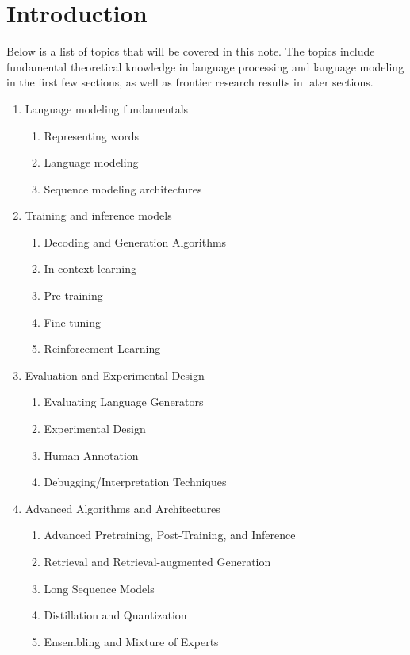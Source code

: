 \documentclass[a4paper]{article}
\begin{document}
\maketitle

\tableofcontents

\section{Introduction}

Below is a list of topics that will be covered in this note. 
The topics include fundamental theoretical knowledge in 
language processing and language modeling in the first 
few sections, as well as frontier research results
in later sections.

\begin{enumerate}
  \item Language modeling fundamentals 
  \begin{enumerate}
    \item Representing words 
    \item Language modeling 
    \item Sequence modeling architectures
  \end{enumerate}

  \item Training and inference models
  \begin{enumerate}
    \item Decoding and Generation Algorithms
    \item In-context learning
    \item Pre-training
    \item Fine-tuning
    \item Reinforcement Learning
  \end{enumerate}

  \item Evaluation and Experimental Design
  \begin{enumerate}
    \item Evaluating Language Generators
    \item Experimental Design
    \item Human Annotation
    \item Debugging/Interpretation Techniques
  \end{enumerate}

  \item Advanced Algorithms and Architectures 
  \begin{enumerate}
    \item Advanced Pretraining, Post-Training, and Inference
    \item Retrieval and Retrieval-augmented Generation
    \item Long Sequence Models
    \item Distillation and Quantization
    \item Ensembling and Mixture of Experts
  \end{enumerate}


\end{enumerate}
\end{document}
